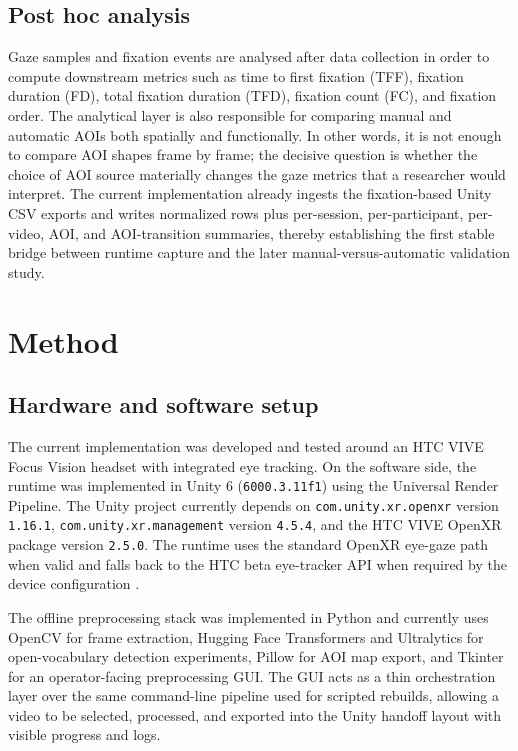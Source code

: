 \documentclass[11pt]{article}
\begin{document}
\subsection{Post hoc analysis}
Gaze samples and fixation events are analysed after data collection in order to compute downstream metrics such as time to first fixation (TFF), fixation duration (FD), total fixation duration (TFD), fixation count (FC), and fixation order. The analytical layer is also responsible for comparing manual and automatic AOIs both spatially and functionally. In other words, it is not enough to compare AOI shapes frame by frame; the decisive question is whether the choice of AOI source materially changes the gaze metrics that a researcher would interpret. The current implementation already ingests the fixation-based Unity CSV exports and writes normalized rows plus per-session, per-participant, per-video, AOI, and AOI-transition summaries, thereby establishing the first stable bridge between runtime capture and the later manual-versus-automatic validation study.

\section{Method}

\subsection{Hardware and software setup}
The current implementation was developed and tested around an HTC VIVE Focus Vision headset with integrated eye tracking. On the software side, the runtime was implemented in Unity 6 (\texttt{6000.3.11f1}) using the Universal Render Pipeline. The Unity project currently depends on \texttt{com.unity.xr.openxr} version \texttt{1.16.1}, \texttt{com.unity.xr.management} version \texttt{4.5.4}, and the HTC VIVE OpenXR package version \texttt{2.5.0}. The runtime uses the standard OpenXR eye-gaze path when valid and falls back to the HTC beta eye-tracker API when required by the device configuration \cite{vive_openxr_overview,vive_eye_gaze,vive_eye_tracker,openxr_eye_gaze_ext}.

The offline preprocessing stack was implemented in Python and currently uses OpenCV for frame extraction, Hugging Face Transformers and Ultralytics for open-vocabulary detection experiments, Pillow for AOI map export, and Tkinter for an operator-facing preprocessing GUI. The GUI acts as a thin orchestration layer over the same command-line pipeline used for scripted rebuilds, allowing a video to be selected, processed, and exported into the Unity handoff layout with visible progress and logs.
\end{document}
